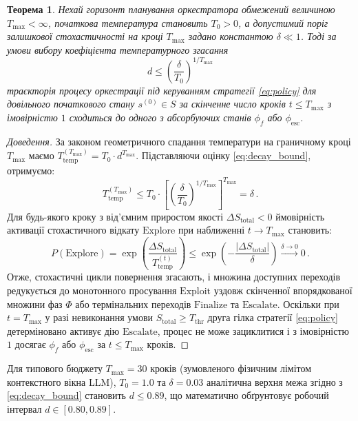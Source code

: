 \documentclass[12pt, reqno, a4paper]{amsart}
\theoremstyle{definition}
\theoremstyle{plain}
\newtheorem{theorem}{Теорема}
\theoremstyle{plain}
\theoremstyle{plain}
\theoremstyle{remark}
\theoremstyle{plain}
\begin{document}
{\begin{theorem}
\label{th:convergence}
Нехай горизонт планування оркестратора обмежений величиною $T_{\max} < \infty$, початкова температура становить $T_0 > 0$, а допустимий поріг залишкової стохастичності на кроці $T_{\max}$ задано константою $\delta \ll 1$. Тоді за умови вибору коефіцієнта температурного згасання
\begin{equation}
\label{eq:decay_bound}
d \le \left( \frac{\delta}{T_0} \right)^{1 / T_{\max}}
\end{equation}
траєкторія процесу оркестрації під керуванням стратегії \eqref{eq:policy} для довільного початкового стану $s^{(0)} \in S$ за скінченне число кроків $t \le T_{\max}$ з імовірністю $1$ сходиться до одного з абсорбуючих станів $\phi_f$ або $\phi_{\text{esc}}$.
\end{theorem}

\begin{proof}[Доведення]
За законом геометричного спадання температури на граничному кроці $T_{\max}$ маємо $T_{\text{temp}}^{(T_{\max})} = T_0 \cdot d^{T_{\max}}$. Підставляючи оцінку \eqref{eq:decay_bound}, отримуємо:
\begin{equation*}
T_{\text{temp}}^{(T_{\max})} \le T_0 \cdot \left[\left(\frac{\delta}{T_0}\right)^{1/T_{\max}}\right]^{T_{\max}} = \delta\, .
\end{equation*}
Для будь-якого кроку з від'ємним приростом якості $\Delta S_{\text{total}} < 0$ ймовірність активації стохастичного відкату $\text{Explore}$ при наближенні $t \to T_{\max}$ становить:
\begin{equation*}
P(\text{Explore}) = \exp\left(\frac{\Delta S_{\text{total}}}{T_{\text{temp}}^{(t)}}\right) \le \exp\left(-\frac{|\Delta S_{\text{total}}|}{\delta}\right) \xrightarrow{\delta \to 0} 0\, .
\end{equation*}
Отже, стохастичні цикли повернення згасають, і множина доступних переходів редукується до монотонного просування $\text{Exploit}$ уздовж скінченної впорядкованої множини фаз $\Phi$ або термінальних переходів $\text{Finalize}$ та $\text{Escalate}$. Оскільки при $t = T_{\max}$ у разі невиконання умови $S_{\text{total}} \ge T_{\text{thr}}$ друга гілка стратегії \eqref{eq:policy} детерміновано активує дію $\text{Escalate}$, процес не може зациклитися і з імовірністю $1$ досягає $\phi_f$ або $\phi_{\text{esc}}$ за $t \le T_{\max}$ кроків.
\end{proof}

Для типового бюджету $T_{\max} = 30$ кроків (зумовленого фізичним лімітом контекстного вікна LLM), $T_0 = 1.0$ та $\delta = 0.03$ аналітична верхня межа згідно з \eqref{eq:decay_bound} становить $d \le 0.89$, що математично обґрунтовує робочий інтервал $d \in [0.80, 0.89]$.

}
\end{document}
